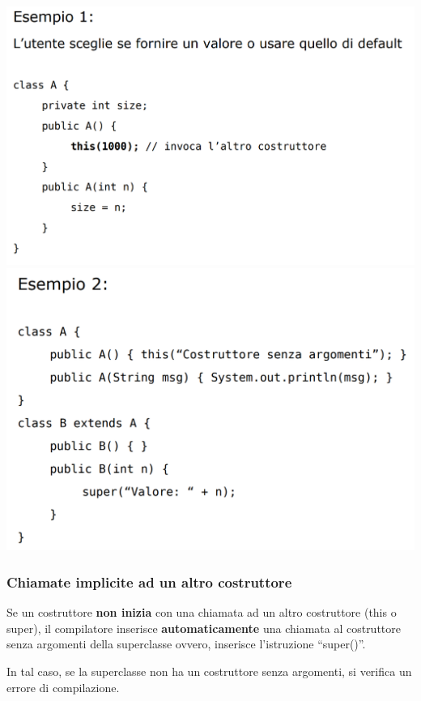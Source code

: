 \documentclass[10pt]{article}
\begin{document}
\includegraphics[scale=0.4]{Immagini/es1_costruttori.png}
\includegraphics[scale=0.4]{Immagini/es2_costruttori.png}
\subsubsection{Chiamate implicite ad un altro costruttore}
Se un costruttore \textbf{non inizia} con una chiamata ad un altro costruttore (this o super), il compilatore inserisce 
\textbf{automaticamente} una chiamata al costruttore senza argomenti della superclasse ovvero, inserisce l’istruzione “super()”.

In tal caso, se la superclasse non ha un costruttore senza argomenti, si verifica un errore di compilazione.
\end{document}
